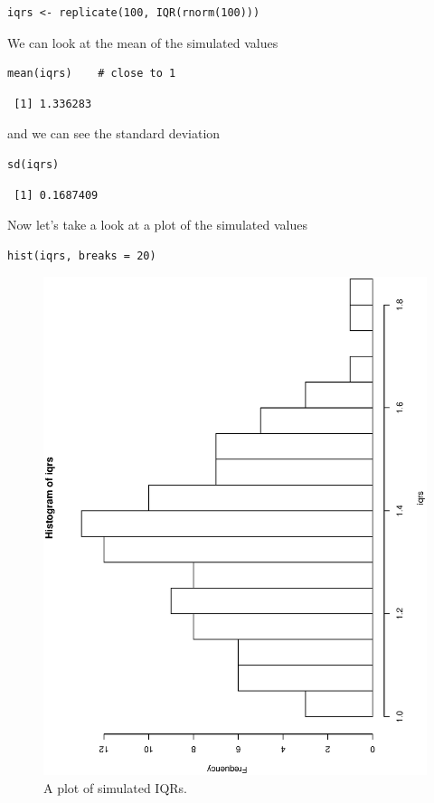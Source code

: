 \documentclass[captions=tableheading]{scrbook}
\begin{document}
\begin{verbatim}
iqrs <- replicate(100, IQR(rnorm(100)))
\end{verbatim}

We can look at the mean of the simulated values

\begin{verbatim}
mean(iqrs)    # close to 1
\end{verbatim}

\begin{verbatim}
 [1] 1.336283
\end{verbatim}

and we can see the standard deviation

\begin{verbatim}
sd(iqrs)
\end{verbatim}

\begin{verbatim}
 [1] 0.1687409
\end{verbatim}

Now let's take a look at a plot of the simulated values


\begin{verbatim}
hist(iqrs, breaks = 20)
\end{verbatim}



\begin{figure}[th]
    \includegraphics[angle=270, totalheight=4in]{img/simulated-IQR.ps}
    \caption[Plot of simulated IQRs]{\small A plot of simulated IQRs.}
    \label{fig:simulated-IQR}
  \end{figure}
\end{document}
